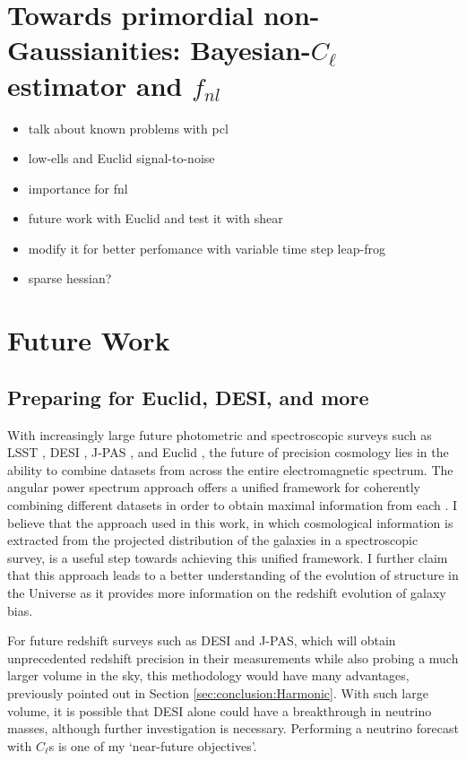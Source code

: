 \section{Towards primordial non-Gaussianities: Bayesian-$C_{\ell}$ estimator and $f_{nl}$}
\begin{itemize}
    \item talk about known problems with pcl
    \item low-ells and Euclid signal-to-noise
    \item importance for fnl
    \item future work with Euclid and test it with shear
    \item modify it for better perfomance with variable time step leap-frog
    \item sparse hessian?
\end{itemize}

\section{Future Work} 
\subsection{Preparing for Euclid, DESI, and more}
\label{sec:conclusion:future}
With increasingly large future photometric and spectroscopic surveys such as LSST \citep{2012arXiv1211.0310L}, DESI \citep{2016-DESI}, J-PAS \citep{JPAS}, and Euclid \citep{2011EuclidRedPaper}, the future of precision cosmology lies in the ability to combine datasets from across the entire electromagnetic spectrum. The angular power spectrum approach offers a unified framework for coherently combining different datasets in order to obtain maximal information from each \citep{JoachimiBridle2010,Kirk2015,2016McLeod}. I believe that the approach used in this work, in which cosmological information is extracted from the projected distribution of the galaxies in a spectroscopic survey, is a useful step towards achieving this unified framework. I further claim that this approach leads to a better understanding of the evolution of structure in the Universe as it provides more information on the redshift evolution of galaxy bias.

\qquad For future redshift surveys such as DESI and J-PAS, which will obtain unprecedented redshift precision in their measurements while also probing a much larger volume in the sky, this methodology would have many advantages, previously pointed out in Section \ref{sec:conclusion:Harmonic}. With such large volume, it is possible that DESI alone could have a breakthrough in neutrino masses, although further investigation is necessary. Performing a neutrino forecast with $C_{\ell}$s is one of my `near-future objectives'.

